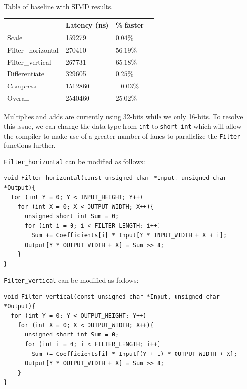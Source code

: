 \documentclass[
  course = {{ESE532 System-on-a-Chip}},
  quartile = {{}},
  assignment = 4,
  name = {{Sheil Sarda, Kate Ballard}},
  studentnumber = {{}},
  email = {{sheils@seas.upenn.edu, kballard@seas.upenn.edu}},
  firstexercise = 1
]{aga-homework}
\begin{document}
\subexercise Table of baseline with SIMD results.
\begin{table}[h]
	\centering
	\begin{tabular}{|l|l|l|l|}
		\hline
		& Latency (ns) & \% faster \\ \hline
		Scale & 159279   & $0.04\%$ \\ \hline
		Filter\_horizontal & 270410 & $56.19\%$ \\ \hline
		Filter\_vertical & 267731 & $65.18\%$  \\ \hline
		Differentiate & 329605  & $0.25\%$  \\ \hline
		Compress & 1512860   & $-0.03\%$  \\ \hline
		Overall & 2540460  & $25.02\%$  \\ \hline
	\end{tabular}
\end{table}

\subexercise
Multiplies and adds are currently using 32-bits while we only 16-bits. To resolve this issue, we can change the data type from \verb|int| to \verb|short int| which will allow the compiler to make use of a greater number of lanes to parallelize the \verb|Filter| functions further.

\subexercise
\verb|Filter_horizontal| can be modified as follows:
\begin{verbatim}
void Filter_horizontal(const unsigned char *Input, unsigned char *Output){ 
  for (int Y = 0; Y < INPUT_HEIGHT; Y++)
    for (int X = 0; X < OUTPUT_WIDTH; X++){
      unsigned short int Sum = 0;
      for (int i = 0; i < FILTER_LENGTH; i++)
        Sum += Coefficients[i] * Input[Y * INPUT_WIDTH + X + i];
      Output[Y * OUTPUT_WIDTH + X] = Sum >> 8;
    }
}
\end{verbatim}

\verb|Filter_vertical| can be modified as follows:
\begin{verbatim}
void Filter_vertical(const unsigned char *Input, unsigned char *Output){
  for (int Y = 0; Y < OUTPUT_HEIGHT; Y++)
    for (int X = 0; X < OUTPUT_WIDTH; X++){
      unsigned short int Sum = 0;
      for (int i = 0; i < FILTER_LENGTH; i++)
        Sum += Coefficients[i] * Input[(Y + i) * OUTPUT_WIDTH + X];
      Output[Y * OUTPUT_WIDTH + X] = Sum >> 8;
    }
}
\end{verbatim}
\end{document}
